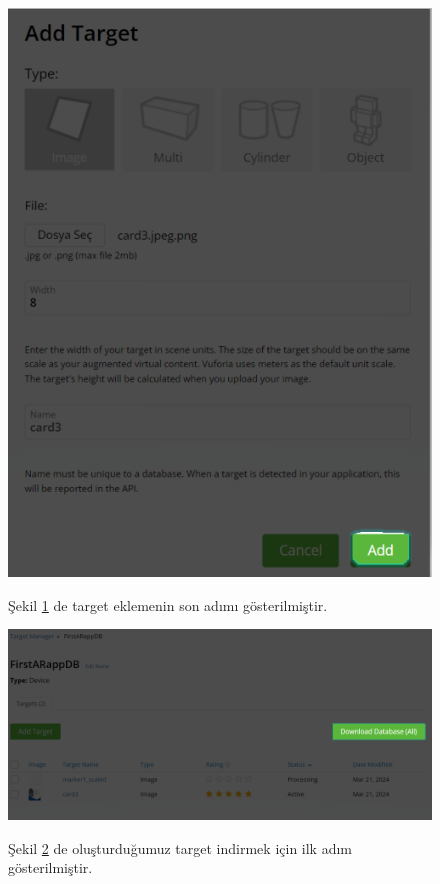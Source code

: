 \documentclass[12pt, a4paper]{article}
\begin{document}
	\begin{figure}[!ht]
		\caption{}
		\centering
		\includegraphics[angle=0, width=\textwidth]{Vuforia13.PNG}
		
		\label{gantt10}
		Şekil \ref{gantt10} de target eklemenin son adımı gösterilmiştir.\cite{Vuforia}
	\end{figure}
	\begin{figure}[!ht]
		\caption{}
		\centering
		\includegraphics[angle=0, width=\textwidth]{Vuforia14.PNG}
		
		\label{gantt11}
		Şekil \ref{gantt11} de oluşturduğumuz target indirmek için ilk adım gösterilmiştir.\cite{Vuforia}
	\end{figure}
\end{document}
